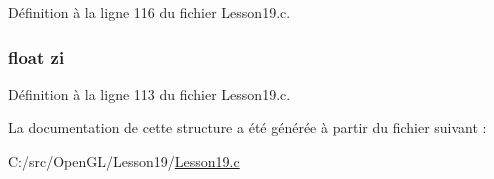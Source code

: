 Définition à la ligne 116 du fichier Lesson19.\+c.

\hypertarget{structparticles_a0f8e8eceb70ae73da2c1ecf3a2ac6cc1}{}
\subsubsection[{zi}]{\setlength{\rightskip}{0pt plus 5cm}float zi}\label{structparticles_a0f8e8eceb70ae73da2c1ecf3a2ac6cc1}


Définition à la ligne 113 du fichier Lesson19.\+c.



La documentation de cette structure a été générée à partir du fichier suivant \+:\begin{DoxyCompactItemize}
\item 
C\+:/src/\+Open\+G\+L/\+Lesson19/\hyperlink{_lesson19_8c}{Lesson19.\+c}\end{DoxyCompactItemize}
